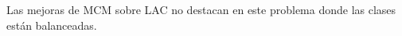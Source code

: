 


Las mejoras de MCM sobre LAC no destacan en este problema donde las clases están balanceadas. 








